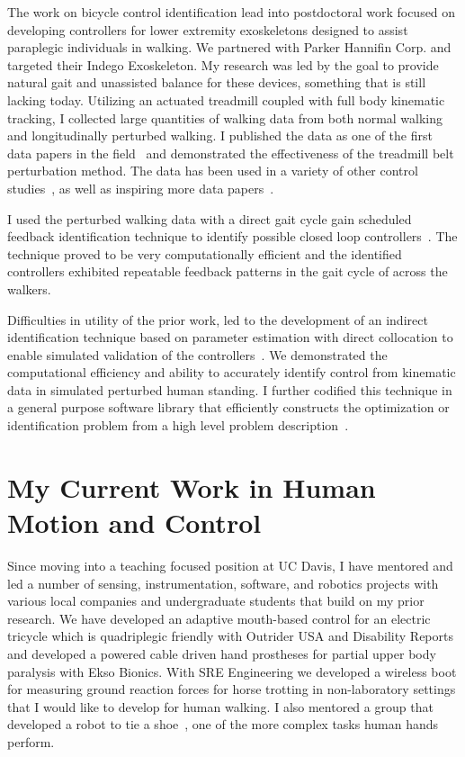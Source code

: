 \documentclass{article}
\begin{document}
The work on bicycle control identification lead into postdoctoral work focused
on developing controllers for lower extremity exoskeletons designed to assist
paraplegic individuals in walking. We partnered with Parker Hannifin Corp. and
targeted their Indego Exoskeleton. My research was led by the goal to provide
natural gait and unassisted balance for these devices, something that is still
lacking today. Utilizing an actuated treadmill coupled with full body kinematic
tracking, I collected large quantities of walking data from both normal walking
and longitudinally perturbed walking. I published the data as one of the first
data papers in the field~\cite{Moore2015b} and demonstrated the effectiveness
of the treadmill belt perturbation method. The data has been used in a variety
of other control studies~\cite{Rohani2017,Thatte2018,Vimal2019}, as well as
inspiring more data papers~\cite{Santos2016,Fukuchi2017,Fukuchi2018,Santuz2018}.

I used the perturbed walking data with a direct gait cycle gain scheduled
feedback identification technique to identify possible closed loop
controllers~\cite{Moore2013c,Moore2014a,Moore2014c}. The technique proved to be
very computationally efficient and the identified controllers exhibited
repeatable feedback patterns in the gait cycle of across the walkers.

Difficulties in utility of the prior work, led to the development of an
indirect identification technique based on parameter estimation with direct
collocation to enable simulated validation of the
controllers~\cite{Moore2014e,Moore2015}.  We demonstrated the computational
efficiency and ability to accurately identify control from kinematic data in
simulated perturbed human standing. I further codified this technique in a
general purpose software library that efficiently constructs the optimization
or identification problem from a high level problem
description~\cite{Moore2014,Moore2018}.

\section*{My Current Work in Human Motion and Control}

Since moving into a teaching focused position at UC Davis, I have mentored and
led a number of sensing, instrumentation, software, and robotics projects with
various local companies and undergraduate students that build on my prior
research. We have developed an adaptive mouth-based control for an electric
tricycle which is quadriplegic friendly with Outrider USA and Disability
Reports and developed a powered cable driven hand prostheses for partial upper
body paralysis with Ekso Bionics. With SRE Engineering we developed a wireless
boot for measuring ground reaction forces for horse trotting in non-laboratory
settings that I would like to develop for human walking. I also mentored a
group that developed a robot to tie a shoe~\cite{Choi2018}, one of the more
complex tasks human hands perform.
\end{document}
